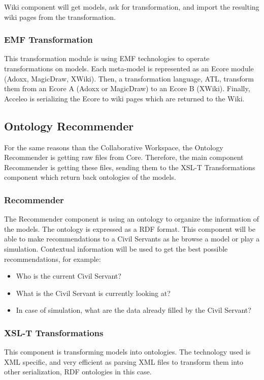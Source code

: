 \documentclass{learnpad}
\begin{document}
Wiki component will get models, ask for transformation, and import the resulting
wiki pages from the transformation.

\subsubsection{EMF Transformation}
This transformation module is using EMF technologies to operate transformations
on models.  Each meta-model is represented as an Ecore module (Adoxx, MagicDraw,
XWiki).  Then, a transformation language, ATL, transform them from an Ecore A
(Adoxx or MagicDraw) to an Ecore B (XWiki).  Finally, Acceleo is serializing the
Ecore to wiki pages which are returned to the Wiki.

\subsection{Ontology Recommender}
For the same reasons than the Collaborative Workspace, the Ontology Recommender
is getting raw files from \learnpad Core.  Therefore, the main component
Recommender is getting these files, sending them to the XSL-T Transformations
component which return back ontologies of the models.

\subsubsection{Recommender}
The Recommender component is using an ontology to organize the information of
the models.  The ontology is expressed as a RDF format.  This component will be
able to make recommendations to a Civil Servants as he browse a model or play a
simulation.  Contextual information will be used to get the best possible
recommendations, for example:
\begin{itemize}
	\item Who is the current Civil Servant?
	\item What is the Civil Servant is currently looking at?
	\item In case of simulation, what are the data already filled by the Civil
		Servant?
\end{itemize}

\subsubsection{XSL-T Transformations}
This component is transforming models into ontologies.  The technology used is
XML specific, and very efficient as parsing XML files to transform them into
other serialization, RDF ontologies in this case.
\end{document}
